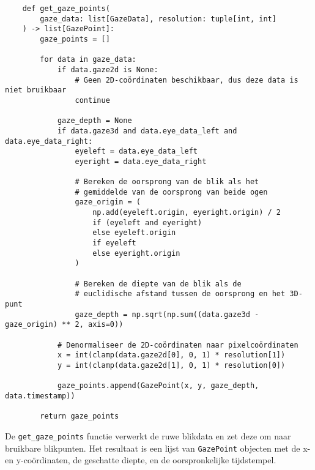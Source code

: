 \begin{listing}[H]
  \begin{verbatim}
    def get_gaze_points(
        gaze_data: list[GazeData], resolution: tuple[int, int]
    ) -> list[GazePoint]:
        gaze_points = [] 
        
        for data in gaze_data:
            if data.gaze2d is None:
                # Geen 2D-coördinaten beschikbaar, dus deze data is niet bruikbaar
                continue

            gaze_depth = None
            if data.gaze3d and data.eye_data_left and data.eye_data_right:
                eyeleft = data.eye_data_left
                eyeright = data.eye_data_right

                # Bereken de oorsprong van de blik als het 
                # gemiddelde van de oorsprong van beide ogen
                gaze_origin = (
                    np.add(eyeleft.origin, eyeright.origin) / 2
                    if (eyeleft and eyeright)
                    else eyeleft.origin
                    if eyeleft
                    else eyeright.origin
                )

                # Bereken de diepte van de blik als de 
                # euclidische afstand tussen de oorsprong en het 3D-punt
                gaze_depth = np.sqrt(np.sum((data.gaze3d - gaze_origin) ** 2, axis=0))

            # Denormaliseer de 2D-coördinaten naar pixelcoördinaten
            x = int(clamp(data.gaze2d[0], 0, 1) * resolution[1])
            y = int(clamp(data.gaze2d[1], 0, 1) * resolution[0])

            gaze_points.append(GazePoint(x, y, gaze_depth, data.timestamp))

        return gaze_points
  \end{verbatim}
  \caption[\texttt{get\_gaze\_points} functie]{
    De \texttt{get\_gaze\_points} functie verwerkt de ruwe blikdata en zet deze om naar bruikbare blikpunten.
    Het resultaat is een lijst van \texttt{GazePoint} objecten met de x- en y-coördinaten, de geschatte diepte, en de oorspronkelijke tijdstempel.
  }
\end{listing}

